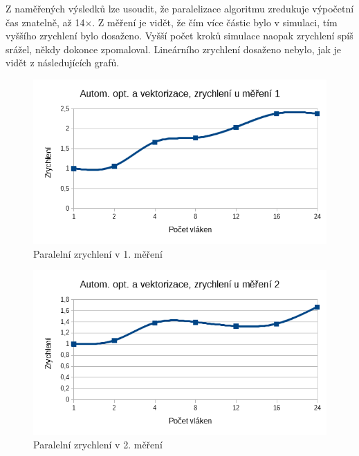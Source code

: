 \documentclass[12pt]{article}
\begin{document}
Z naměřených výsledků lze usoudit, že paralelizace algoritmu zredukuje výpočetní čas znatelně, až 14${\times}$.
Z měření je vidět, že čím více částic bylo v simulaci, tím vyššího zrychlení bylo dosaženo.
Vyšší počet kroků simulace naopak zrychlení spíš srážel, někdy dokonce zpomaloval.
Lineárního zrychlení dosaženo nebylo, jak je vidět z následujících grafů.

\begin{figure}[H]
  \begin{center}
     \includegraphics[width=12cm]{images/auto1acc.png}
    \caption{Paralelní zrychlení v 1. měření} 
  \end{center}
\end{figure}

\begin{figure}[H]
  \begin{center}
     \includegraphics[width=12cm]{images/auto2acc.png}
    \caption{Paralelní zrychlení v 2. měření} 
  \end{center}
\end{figure}
\end{document}
